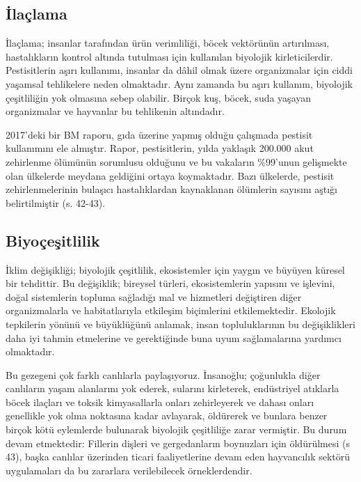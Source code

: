 \documentclass[
]{book}
\begin{document}
\hypertarget{ilauxe7lama}{%
\subsection{İlaçlama}\label{ilauxe7lama}}

İlaçlama; insanlar tarafından ürün verimliliği, böcek vektörünün artırılması, hastalıkların kontrol altında tutulması için kullanılan biyolojik kirleticilerdir. Pestisitlerin aşırı kullanımı, insanlar da dâhil olmak üzere organizmalar için ciddi yaşamsal tehlikelere neden olmaktadır. Aynı zamanda bu aşırı kullanım, biyolojik çeşitliliğin yok olmasına sebep olabilir. Birçok kuş, böcek, suda yaşayan organizmalar ve hayvanlar bu tehlikenin altındadır. \citep{dubey2021climate}

2017'deki bir BM raporu, gıda üzerine yapmış olduğu çalışmada pestisit kullanımını ele almıştır. Rapor, pestisitlerin, yılda yaklaşık 200.000 akut zehirlenme ölümünün sorumlusu olduğunu ve bu vakaların \%99'unun gelişmekte olan ülkelerde meydana geldiğini ortaya koymaktadır. Bazı ülkelerde, pestisit zehirlenmelerinin bulaşıcı hastalıklardan kaynaklanan ölümlerin sayısını aştığı belirtilmiştir (s. 42-43). \citep{bush2020}

\hypertarget{biyouxe7eux15fitlilik}{%
\subsection{Biyoçeşitlilik}\label{biyouxe7eux15fitlilik}}

İklim değişikliği; biyolojik çeşitlilik, ekosistemler için yaygın ve büyüyen küresel bir tehdittir. Bu değişiklik; bireysel türleri, ekosistemlerin yapısını ve işlevini, doğal sistemlerin topluma sağladığı mal ve hizmetleri değiştiren diğer organizmalarla ve habitatlarıyla etkileşim biçimlerini etkilemektedir. Ekolojik tepkilerin yönünü ve büyüklüğünü anlamak, insan topluluklarının bu değişiklikleri daha iyi tahmin etmelerine ve gerektiğinde buna uyum sağlamalarına yardımcı olmaktadır. \citep{weiskopf2020climate}

Bu gezegeni çok farklı canlılarla paylaşıyoruz. İnsanoğlu; çoğunlukla diğer canlıların yaşam alanlarını yok ederek, sularını kirleterek, endüstriyel atıklarla böcek ilaçları ve toksik kimyasallarla onları zehirleyerek ve dahası onları genellikle yok olma noktasına kadar avlayarak, öldürerek ve bunlara benzer birçok kötü eylemlerde bulunarak biyolojik çeşitliliğe zarar vermiştir. Bu durum devam etmektedir: Fillerin dişleri ve gergedanların boynuzları için öldürülmesi (s 43), \citep{bush2020} başka canlılar üzerinden ticari faaliyetlerine devam eden hayvancılık sektörü uygulamaları da bu zararlara verilebilecek örneklerdendir.
\end{document}
